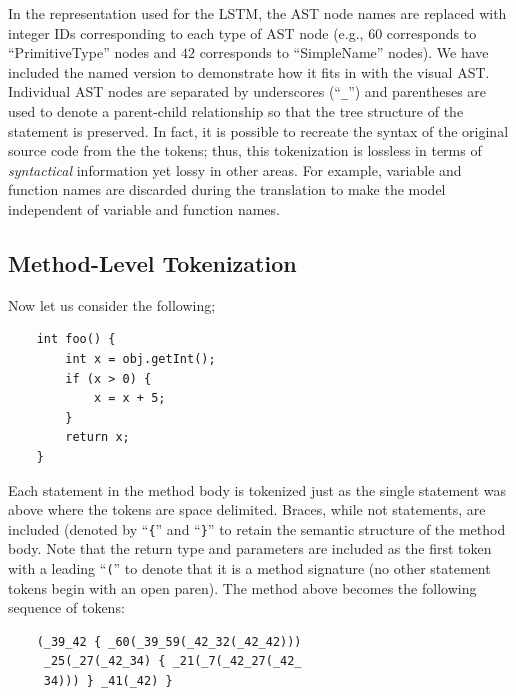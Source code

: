 \documentclass[runningheads,a4paper]{llncs}
\begin{document}
In the representation used for the LSTM, the AST node names are replaced with
integer IDs corresponding to each type of AST node
(e.g., $60$ corresponds to ``PrimitiveType'' nodes and $42$ corresponds to
``SimpleName'' nodes).
We have included the named version to demonstrate
how it fits in with the visual AST.  Individual AST nodes are
separated by underscores (``\texttt{\_}'') and parentheses are used
to denote a parent-child relationship so that the tree structure of
the statement is preserved. In fact, it is possible  to recreate the
syntax of the original source  code from the the tokens; thus, this 
tokenization is lossless in terms of  \textit{syntactical} information 
yet lossy in other areas. For example, variable and function names are
discarded during the translation to make the model independent of
variable and function names.


\subsection{Method-Level Tokenization}

Now let us consider the following;

\begin{verbatim}
    int foo() {
        int x = obj.getInt();
        if (x > 0) {
            x = x + 5;
        }
        return x;
    }
\end{verbatim}

Each statement in the method body is tokenized just as the single statement 
was above where the tokens are space delimited. Braces, while not 
statements, are included (denoted by ``\texttt\{'' and
``\texttt\}''  to retain the semantic structure of the method body. 
Note that the return type and parameters are included as the first 
token with a leading ``\texttt('' to denote that it is a method
signature (no other statement tokens begin with an open paren).
The method above becomes the following sequence of tokens:

\begin{verbatim}
    (_39_42 { _60(_39_59(_42_32(_42_42)))
     _25(_27(_42_34) { _21(_7(_42_27(_42_
     34))) } _41(_42) } 
\end{verbatim}
\end{document}
